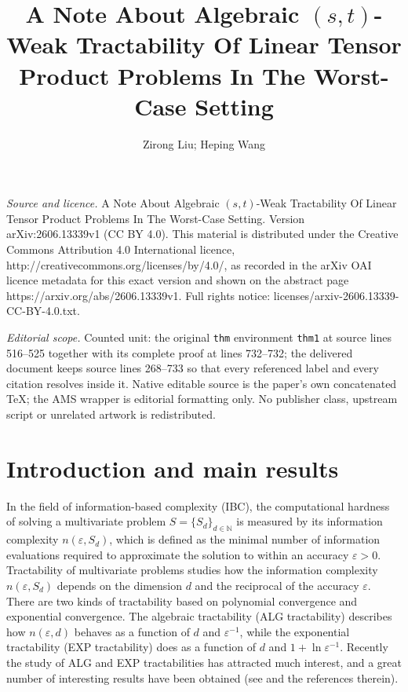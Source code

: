 \documentclass[10pt,a4paper]{amsart}
\numberwithin{equation}{section}
\def\vz{\varepsilon}
\begin{document}
\title[A Note About Algebraic (s, t)-Weak Tractability Of Linear Te]{A Note About Algebraic $(s, t)$-Weak Tractability Of Linear Tensor Product Problems In The Worst-Case Setting}
\author{Zirong Liu; Heping Wang}
\date{}
\maketitle
\noindent\emph{Source and licence.} A Note About Algebraic $(s, t)$-Weak Tractability Of Linear Tensor Product Problems In The Worst-Case Setting. Version arXiv:2606.13339v1 (CC BY 4.0). This material is distributed under the Creative Commons Attribution 4.0 International licence, http://creativecommons.org/licenses/by/4.0/, as recorded in the arXiv OAI licence metadata for this exact version and shown on the abstract page https://arxiv.org/abs/2606.13339v1. Full rights notice: licenses/arxiv-2606.13339-CC-BY-4.0.txt.\par\smallskip
\noindent\textit{Editorial scope.} Counted unit: the original \texttt{thm} environment \texttt{thm1} at source lines 516--525 together with its complete proof at lines 732--732; the delivered document keeps source lines 268--733 so that every referenced label and every citation resolves inside it. Native editable source is the paper's own concatenated TeX; the AMS wrapper is editorial formatting only. No publisher class, upstream script or unrelated artwork is redistributed.
\section{Introduction and main results}





In the field of information-based complexity (IBC), the
computational hardness of solving a multivariate  problem $S =
\{S_d\}_{d \in \mathbb{N}}$ is measured by its information
complexity $n(\varepsilon, S_d)$, which is defined as the minimal
number of information evaluations required to approximate the
solution to within an accuracy $\varepsilon > 0$. Tractability of
multivariate problems studies how the information complexity
$n(\varepsilon, S_d)$  depends on  the dimension  $d$ and the
reciprocal of the accuracy $\vz$. There are two kinds of
tractability based on polynomial convergence and exponential
convergence. The algebraic tractability (ALG tractability)
describes how  $n(\vz, d)$ behaves as a function of $d$ and
$\vz^{-1}$, while the exponential tractability (EXP tractability)
does as a function of $d$ and $1+\ln\vz^{-1}$. Recently the  study
of ALG and EXP tractabilities has attracted much interest, and a
great number of interesting results
 have been obtained (see
\cite{ CW1, DKPW14, DLPW11, GW11, IKPW16a, KW19, KPW, NW08, NW10, NW12,
PP14, PPW17, S13, SW15, W19, X15} and the references therein).
\end{document}
